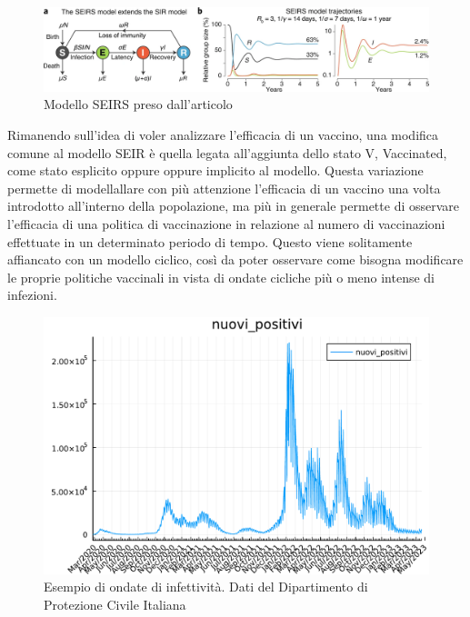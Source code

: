 \newpage

\begin{figure}[h]
    \includegraphics[width=\linewidth]{img/41592_2020_856_Fig1_HTML.png}
    \caption{Modello SEIRS preso dall'articolo \cite{Bjornstad2020}}
    \label{fig:SEIRS_model}
\end{figure}

Rimanendo sull'idea di voler analizzare l'efficacia di un vaccino, una
modifica comune al modello SEIR è quella legata all'aggiunta dello stato V,
Vaccinated, come stato esplicito oppure oppure implicito al modello. Questa 
variazione permette di modellallare con più attenzione l'efficacia di un 
vaccino una volta introdotto all'interno della popolazione, 
ma più in generale permette di osservare l'efficacia di una politica di vaccinazione 
in relazione al numero di vaccinazioni effettuate in un determinato periodo di tempo.
Questo viene solitamente affiancato con un modello ciclico, così da poter
osservare come bisogna modificare le proprie politiche vaccinali in vista
di ondate cicliche più o meno intense di infezioni.

\begin{figure}[h]
    \begin{center}
        \includegraphics[scale=0.6]{img/nuovi_positivi_2023-04-21.pdf}
        \caption{Esempio di ondate di infettività. Dati del Dipartimento di Protezione Civile Italiana}
        \label{fig:DPC_new_positive}
    \end{center}
\end{figure}

